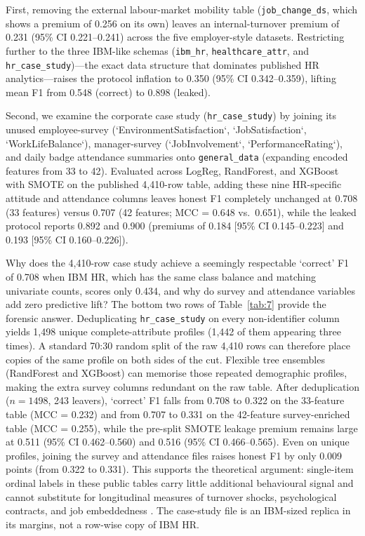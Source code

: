 \documentclass[12pt,a4paper]{article}
\begin{document}
First, removing the external labour-market mobility table (\texttt{job\_change\_ds}, which shows a premium of 0.256 on its own) leaves an internal-turnover premium of 0.231 (95\% CI 0.221--0.241) across the five employer-style datasets. Restricting further to the three IBM-like schemas (\texttt{ibm\_hr}, \texttt{healthcare\_attr}, and \texttt{hr\_case\_study})---the exact data structure that dominates published HR analytics---raises the protocol inflation to 0.350 (95\% CI 0.342--0.359), lifting mean F1 from 0.548 (correct) to 0.898 (leaked).

Second, we examine the corporate case study (\texttt{hr\_case\_study}) by joining its unused employee-survey (`EnvironmentSatisfaction`, `JobSatisfaction`, `WorkLifeBalance`), manager-survey (`JobInvolvement`, `PerformanceRating`), and daily badge attendance summaries onto \texttt{general\_data} (expanding encoded features from 33 to 42). Evaluated across LogReg, RandForest, and XGBoost with SMOTE on the published 4,410-row table, adding these nine HR-specific attitude and attendance columns leaves honest F1 completely unchanged at 0.708 (33 features) versus 0.707 (42 features; MCC = 0.648 vs.\ 0.651), while the leaked protocol reports 0.892 and 0.900 (premiums of 0.184 [95\% CI 0.145--0.223] and 0.193 [95\% CI 0.160--0.226]).

Why does the 4,410-row case study achieve a seemingly respectable `correct' F1 of 0.708 when IBM HR, which has the same class balance and matching univariate counts, scores only 0.434, and why do survey and attendance variables add zero predictive lift? The bottom two rows of Table~\ref{tab:7} provide the forensic answer. Deduplicating \texttt{hr\_case\_study} on every non-identifier column yields 1,498 unique complete-attribute profiles (1,442 of them appearing three times). A standard 70:30 random split of the raw 4,410 rows can therefore place copies of the same profile on both sides of the cut. Flexible tree ensembles (RandForest and XGBoost) can memorise those repeated demographic profiles, making the extra survey columns redundant on the raw table. After deduplication ($n = 1498$, 243 leavers), `correct' F1 falls from 0.708 to 0.322 on the 33-feature table (MCC = 0.232) and from 0.707 to 0.331 on the 42-feature survey-enriched table (MCC = 0.255), while the pre-split SMOTE leakage premium remains large at 0.511 (95\% CI 0.462--0.560) and 0.516 (95\% CI 0.466--0.565). Even on unique profiles, joining the survey and attendance files raises honest F1 by only 0.009 points (from 0.322 to 0.331). This supports the theoretical argument: single-item ordinal labels in these public tables carry little additional behavioural signal and cannot substitute for longitudinal measures of turnover shocks, psychological contracts, and job embeddedness \parencite{ref46,ref47,ref48}. The case-study file is an IBM-sized replica in its margins, not a row-wise copy of IBM HR.
\end{document}
